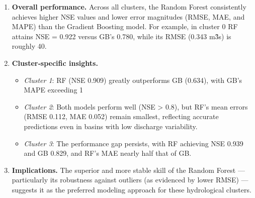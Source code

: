 \begin{enumerate}
    \item \textbf{Overall performance.} Across all clusters, the Random Forest consistently achieves higher NSE values and lower error magnitudes (RMSE, MAE, and MAPE) than the Gradient Boosting model. For example, in cluster 0 RF attains NSE = 0.922 versus GB's 0.780, while its RMSE (0.343 m\^3\/s) is roughly 40.
    \item \textbf{Cluster‐specific insights.} \begin{itemize}
              \item \emph{Cluster 1}: RF (NSE 0.909) greatly outperforms GB (0.634), with GB's MAPE exceeding 1 %
              \item \emph{Cluster 2}: Both models perform well (NSE > 0.8), but RF's mean errors (RMSE 0.112, MAE 0.052) remain smallest, reflecting accurate predictions even in basins with low discharge variability.
              \item \emph{Cluster 3}: The performance gap persists, with RF achieving NSE 0.939 and GB 0.829, and RF's MAE nearly half that of GB.
          \end{itemize}
    \item \textbf{Implications.} The superior and more stable skill of the Random Forest --- particularly its robustness against outliers (as evidenced by lower RMSE) --- suggests it as the preferred modeling approach for these hydrological clusters.
\end{enumerate}


